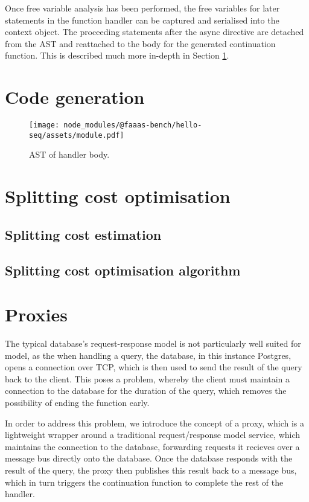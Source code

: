 Once free variable analysis has been performed, the free variables for later statements in the function handler can be captured and serialised into the context object. The proceeding statements after the async directive are detached from the AST and reattached to the body for the generated continuation function. This is described much more in-depth in Section \ref{sec:faaasc-codegen-ast}.

\section{Code generation}
\label{sec:faaasc-codegen-ast}

\begin{figure}[t]
    \texttt{[image: node\_modules/@faaas-bench/hello-seq/assets/module.pdf]}
    \caption{AST of handler body.}
    \label{fig:suites-hello-seq-module-ast}
\end{figure}

\section{Splitting cost optimisation}

\subsection{Splitting cost estimation}

\subsection{Splitting cost optimisation algorithm}

\section{Proxies}
The typical database's request-response model is not particularly well suited for \faaas{} model, as the when handling a query, the database, in this instance Postgres, opens a connection over TCP, which is then used to send the result of the query back to the client. This poses a problem, whereby the client must maintain a connection to the database for the duration of the query, which removes the possibility of ending the function early.

In order to address this problem, we introduce the concept of a proxy, which is a lightweight wrapper around a traditional request/response model service, which maintains the connection to the database, forwarding requests it recieves over a message bus directly onto the database. Once the database responds with the result of the query, the proxy then publishes this result back to a message bus, which in turn triggers the continuation function to complete the rest of the handler.

